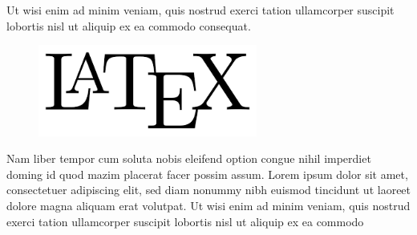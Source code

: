 Ut wisi enim ad minim veniam, quis nostrud exerci tation ullamcorper suscipit lobortis nisl ut aliquip ex ea commodo consequat. 

\begin{figure}[ht]
\begin{center}
	\includegraphics[height=3cm]{./Images/LATEXLogo.png}
\end{center}
\end{figure}
\label{Abbildung1}

Nam liber tempor cum soluta nobis eleifend option congue nihil imperdiet doming id quod mazim placerat facer possim assum. Lorem ipsum dolor sit amet, consectetuer adipiscing elit, sed diam nonummy nibh euismod tincidunt ut laoreet dolore magna aliquam erat volutpat. Ut wisi enim ad minim veniam, quis nostrud exerci tation ullamcorper suscipit lobortis nisl ut aliquip ex ea commodo


